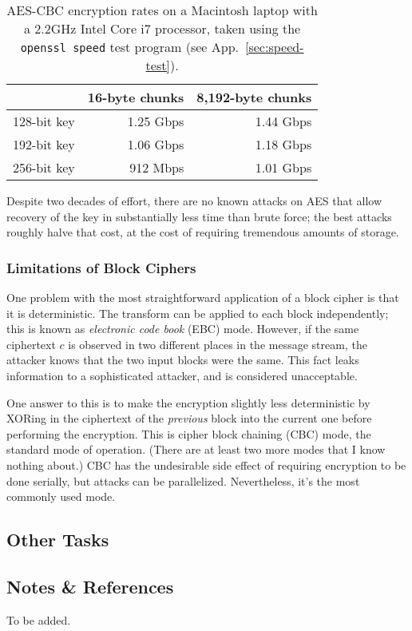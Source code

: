 \begin{table}
\begin{tabular}{l | r | r}
            & 16-byte chunks & 8,192-byte chunks \\\hline
128-bit key & 1.25 Gbps & 1.44 Gbps \\
192-bit key & 1.06 Gbps & 1.18 Gbps \\
256-bit key & 912 Mbps & 1.01 Gbps
\end{tabular}
\caption{AES-CBC encryption rates on a Macintosh laptop with a 2.2GHz
  Intel Core i7 processor, taken using the {\tt openssl speed} test
  program (see App.~\ref{sec:speed-test}).}
\label{tab:mac-aes}
\end{table}

Despite two decades of effort, there are no known attacks on AES that
allow recovery of the key in substantially less time than brute force;
the best attacks roughly halve that cost, at the cost of requiring
tremendous amounts of storage. 

\subsubsection{Limitations of Block Ciphers}
\label{sec:limitations}

One problem with the most straightforward application of a block
cipher is that it is deterministic.  The transform can be applied to
each block independently; this is known as \emph{electronic code book}
(EBC) mode.  However, if the same ciphertext $c$ is observed in two
different places in the message stream, the attacker knows that the
two input blocks were the same.  This fact leaks information to a
sophisticated attacker, and is considered unacceptable.

One answer to this is to make the encryption slightly less
deterministic by XORing in the ciphertext of the \emph{previous} block into
the current one before performing the encryption.  This is cipher
block chaining (CBC) mode, the standard mode of operation.  (There are
at least two more modes that I know nothing about.)  CBC has the
undesirable side effect of requiring encryption to be done serially,
but attacks can be parallelized.  Nevertheless, it's the most commonly
used mode.

\subsection{Other Tasks}




\subsection{Notes \& References}

To be added.

